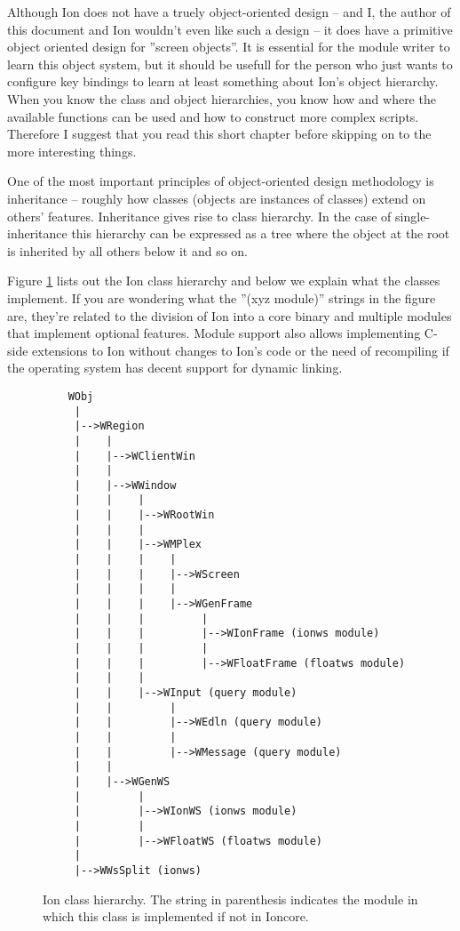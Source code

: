 
\label{chap:prelim}

Although Ion does not have a truely object-oriented design -- and I,
the author of this document and Ion wouldn't even like such a design -- 
it does have a primitive object oriented design for ''screen objects''.
It is essential for the module writer to learn this object system,
but it should be usefull for the person who just wants to configure
key bindings to learn at least something about Ion's object hierarchy.
When you know the class and object hierarchies, you know how and where
the available functions can be used and how to construct more complex
scripts. Therefore I suggest that you read this short chapter before
skipping on to the more interesting things.



One of the most important principles of object-oriented design methodology
is inheritance -- roughly how classes (objects are instances of classes)
extend on others' features. Inheritance gives rise to class hierarchy.
In the case of single-inheritance this hierarchy can be expressed as a
tree where the object at the root is inherited by all others below it
and so on.

Figure \ref{fig:classhierarchy} lists out the Ion class hierarchy and below
we explain what the classes implement. If you are wondering what the 
''(xyz module)'' strings in the figure are, they're related to the 
division of Ion into a core binary and multiple modules that implement
optional features. Module support also allows implementing  C-side
extensions to Ion without changes to Ion's code or the need of 
recompiling if the operating system has decent support for dynamic 
linking.

\begin{figure}
\begin{verbatim}
    WObj
     |
     |-->WRegion
     |    |
     |    |-->WClientWin
     |    |
     |    |-->WWindow
     |    |    |
     |    |    |-->WRootWin
     |    |    |
     |    |    |-->WMPlex
     |    |    |    |
     |    |    |    |-->WScreen
     |    |    |    |
     |    |    |    |-->WGenFrame
     |    |    |         |
     |    |    |         |-->WIonFrame (ionws module)
     |    |    |         |
     |    |    |         |-->WFloatFrame (floatws module)
     |    |    |
     |    |    |-->WInput (query module)
     |    |         |
     |    |         |-->WEdln (query module)
     |    |         |
     |    |         |-->WMessage (query module)
     |    |
     |    |-->WGenWS
     |         |
     |         |-->WIonWS (ionws module)
     |         |
     |         |-->WFloatWS (floatws module)
     |
     |-->WWsSplit (ionws)
\end{verbatim}
\caption{Ion class hierarchy. The string in parenthesis indicates
  the module in which this class is implemented if not in Ioncore.}
\label{fig:classhierarchy}
\end{figure}

